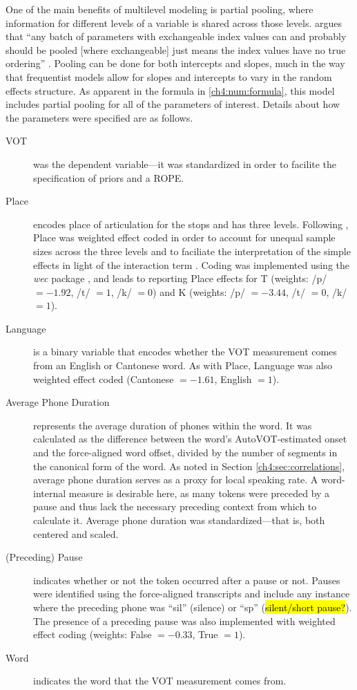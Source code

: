 One of the main benefits of multilevel modeling is partial pooling, where information for different levels of a variable is shared across those levels. \citeauthor{mcelreath_2020_sr} argues that ``any batch of parameters with exchangeable index values can and probably should be pooled [where exchangeable] just means the index values have no true ordering'' \citeyearpar[][p. 435]{mcelreath_2020_sr}. Pooling can be done for both intercepts and slopes, much in the way that frequentist models allow for slopes and intercepts to vary in the random effects structure. As apparent in the formula in \ref{ch4:num:formula}, this model includes partial pooling for all of the parameters of interest. Details about how the parameters were specified are as follows.  

\begin{description}
  \item[VOT] was the dependent variable---it was standardized in order to facilite the specification of priors and a ROPE. %
  \item[Place] encodes place of articulation for the stops and has three levels. Following \citet{chodroff_2017_structure}, Place was weighted effect coded in order to account for unequal sample sizes across the three levels and to faciliate the interpretation of the simple effects in light of the interaction term \citep{brehm_2021_contrasts}. Coding was implemented using the \textit{wec} package \citep{nieuwenhuis_2017_weighted}, and leads to reporting Place effects for T (weights: /p/ $=-1.92$, /t/ $=1$, /k/ $=0$) and K (weights: /p/ $=-3.44$, /t/ $=0$, /k/ $=1$).
  \item[Language] is a binary variable that encodes whether the VOT measurement comes from an English or Cantonese word. As with Place, Language was also weighted effect coded (Cantonese $=-1.61$, English $=1$).
  \item[Average Phone Duration] represents the average duration of phones within the word. It was calculated as the difference between the word's AutoVOT-estimated onset and the force-aligned word offset, divided by the number of segments in the canonical form of the word. As noted in Section \ref{ch4:sec:correlations}, average phone duration serves as a proxy for local speaking rate. A word-internal measure is desirable here, as many tokens were preceded by a pause and thus lack the necessary preceding context from which to calculate it. Average phone duration was standardized---that is, both centered and scaled. 
  \item[(Preceding) Pause] indicates whether or not the token occurred after a pause or not. Pauses were identified using the force-aligned transcripts and include any instance where the preceding phone was ``sil'' (silence) or ``sp'' (\hl{silent/short pause?}). The presence of a preceding pause was also implemented with weighted effect coding (weights: False $=-0.33$, True $=1$).
  \item[Word] indicates the word that the VOT measurement comes from. 
\end{description}


